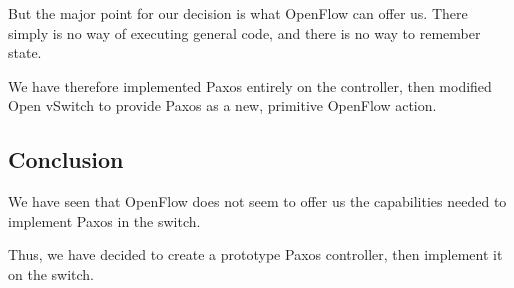 But the major point for our decision is what OpenFlow can offer us.
There simply is no way of executing general code, and there is no way to
remember state.

We have therefore implemented Paxos entirely on the controller, then
modified Open vSwitch to provide Paxos as a new, primitive OpenFlow action.

\subsection{Conclusion}

We have seen that OpenFlow does not seem to offer us the capabilities needed
to implement Paxos in the switch.

Thus, we have decided to create a prototype Paxos controller, then implement
it on the switch.
